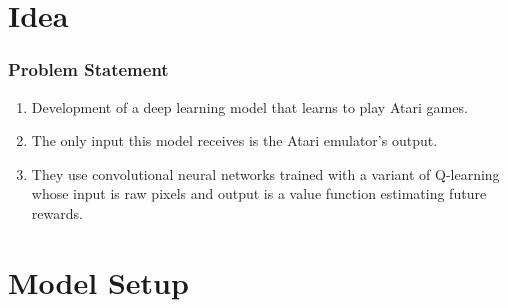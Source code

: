\documentclass[12pt]{beamer}
\begin{document}
\begin{frame}
{\begin{figure}
			\end{figure}
			}	
			\pause
\end{frame}

\section{Idea}
\begin{frame}
\frametitle{Problem Statement}
\begin{enumerate}
\item Development of a deep learning model that learns to play Atari games.
\item   The only input this model receives is the Atari emulator's output. 
\item They use convolutional neural networks trained with a variant of Q-learning whose input is raw pixels and output is a value function estimating future rewards.
\end{enumerate}

\end{frame}

\section{Model Setup}
\end{document}
